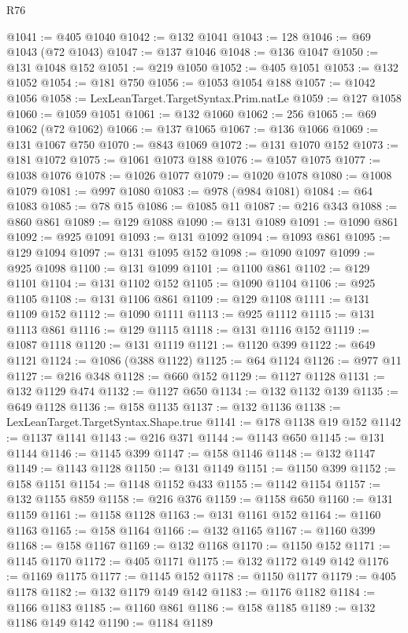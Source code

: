 \begin{lexlean}{R76}
\begin{coremodule}
@1041 := @405 @1040
@1042 := @132 @1041
@1043 := 128
@1046 := @69 @1043 (@72 @1043)
@1047 := @137 @1046
@1048 := @136 @1047
@1050 := @131 @1048 @152
@1051 := @219 @1050
@1052 := @405 @1051
@1053 := @132 @1052
@1054 := @181 @750
@1056 := @1053 @1054 @188
@1057 := @1042 @1056
@1058 := LexLeanTarget.TargetSyntax.Prim.natLe
@1059 := @127 @1058
@1060 := @1059 @1051
@1061 := @132 @1060
@1062 := 256
@1065 := @69 @1062 (@72 @1062)
@1066 := @137 @1065
@1067 := @136 @1066
@1069 := @131 @1067 @750
@1070 := @843 @1069
@1072 := @131 @1070 @152
@1073 := @181 @1072
@1075 := @1061 @1073 @188
@1076 := @1057 @1075
@1077 := @1038 @1076
@1078 := @1026 @1077
@1079 := @1020 @1078
@1080 := @1008 @1079
@1081 := @997 @1080
@1083 := @978 (@984 @1081)
@1084 := @64 @1083
@1085 := @78 @15
@1086 := @1085 @11
@1087 := @216 @343
@1088 := @860 @861
@1089 := @129 @1088
@1090 := @131 @1089
@1091 := @1090 @861
@1092 := @925 @1091
@1093 := @131 @1092
@1094 := @1093 @861
@1095 := @129 @1094
@1097 := @131 @1095 @152
@1098 := @1090 @1097
@1099 := @925 @1098
@1100 := @131 @1099
@1101 := @1100 @861
@1102 := @129 @1101
@1104 := @131 @1102 @152
@1105 := @1090 @1104
@1106 := @925 @1105
@1108 := @131 @1106 @861
@1109 := @129 @1108
@1111 := @131 @1109 @152
@1112 := @1090 @1111
@1113 := @925 @1112
@1115 := @131 @1113 @861
@1116 := @129 @1115
@1118 := @131 @1116 @152
@1119 := @1087 @1118
@1120 := @131 @1119
@1121 := @1120 @399
@1122 := @649 @1121
@1124 := @1086 (@388 @1122)
@1125 := @64 @1124
@1126 := @977 @11
@1127 := @216 @348
@1128 := @660 @152
@1129 := @1127 @1128
@1131 := @132 @1129 @474
@1132 := @1127 @650
@1134 := @132 @1132 @139
@1135 := @649 @1128
@1136 := @158 @1135
@1137 := @132 @1136
@1138 := LexLeanTarget.TargetSyntax.Shape.true
@1141 := @178 @1138 @19 @152
@1142 := @1137 @1141
@1143 := @216 @371
@1144 := @1143 @650
@1145 := @131 @1144
@1146 := @1145 @399
@1147 := @158 @1146
@1148 := @132 @1147
@1149 := @1143 @1128
@1150 := @131 @1149
@1151 := @1150 @399
@1152 := @158 @1151
@1154 := @1148 @1152 @433
@1155 := @1142 @1154
@1157 := @132 @1155 @859
@1158 := @216 @376
@1159 := @1158 @650
@1160 := @131 @1159
@1161 := @1158 @1128
@1163 := @131 @1161 @152
@1164 := @1160 @1163
@1165 := @158 @1164
@1166 := @132 @1165
@1167 := @1160 @399
@1168 := @158 @1167
@1169 := @132 @1168
@1170 := @1150 @152
@1171 := @1145 @1170
@1172 := @405 @1171
@1175 := @132 @1172 @149 @142
@1176 := @1169 @1175
@1177 := @1145 @152
@1178 := @1150 @1177
@1179 := @405 @1178
@1182 := @132 @1179 @149 @142
@1183 := @1176 @1182
@1184 := @1166 @1183
@1185 := @1160 @861
@1186 := @158 @1185
@1189 := @132 @1186 @149 @142
@1190 := @1184 @1189

\end{coremodule}
\end{lexlean}
